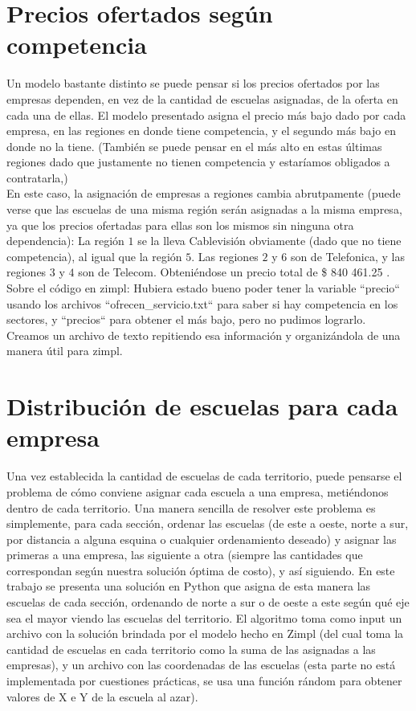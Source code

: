 \documentclass{article}
\begin{document}
\section{Precios ofertados según competencia}
Un modelo bastante distinto se puede pensar si los precios ofertados por las empresas dependen, en vez de la cantidad de escuelas asignadas, de la oferta en cada una de ellas.
El modelo presentado asigna el precio más bajo dado por cada empresa, en las regiones en donde tiene competencia, y el segundo más bajo en donde no la tiene. (También se puede pensar en el más alto en estas últimas regiones dado que justamente no tienen competencia y estaríamos obligados a contratarla,) \\
En este caso, la asignación de empresas a regiones cambia abrutpamente (puede verse que las escuelas de una misma región serán asignadas a la misma empresa, ya que los precios ofertadas para ellas son los mismos sin ninguna otra dependencia): La región $1$ se la lleva Cablevisión obviamente (dado que no tiene competencia), al igual que la región $5$. Las regiones $2$ y $6$ son de Telefonica, y las regiones $3$ y $4$ son de Telecom. Obteniéndose un precio total de \$ 840 461.25 . \\
Sobre el código en zimpl: Hubiera estado bueno poder tener la variable ``precio`` usando los archivos ``ofrecen\_servicio.txt`` para saber si hay competencia en los sectores, y ``precios`` para obtener el más bajo, pero no pudimos lograrlo. Creamos un archivo de texto repitiendo esa información y organizándola de una manera útil para zimpl.

\section{Distribución de escuelas para cada empresa}

Una vez establecida la cantidad de escuelas de cada territorio, puede pensarse el problema de cómo conviene asignar cada escuela a una empresa, metiéndonos dentro de cada territorio.
Una manera sencilla de resolver este problema es simplemente, para cada sección, ordenar las escuelas (de este a oeste, norte a sur, por distancia a alguna esquina o cualquier ordenamiento deseado) y asignar las primeras a una empresa, las siguiente a otra (siempre las cantidades que correspondan según nuestra solución óptima de costo), y así siguiendo. En este trabajo se presenta una solución en Python que asigna de esta manera las escuelas de cada sección, ordenando de norte a sur o de oeste a este según qué eje sea el mayor viendo las escuelas del territorio. El algoritmo toma como input un archivo con la solución brindada por el modelo hecho en Zimpl (del cual toma la cantidad de escuelas en cada territorio como la suma de las asignadas a las empresas), y un archivo con las coordenadas de las escuelas (esta parte no está implementada por cuestiones prácticas, se usa una función rándom para obtener valores de X e Y de la escuela al azar).
\end{document}
